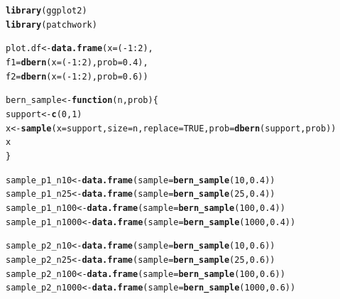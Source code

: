 \documentclass{article}\usepackage[]{graphicx}\usepackage[]{color}
\makeatletter
\newcommand{\hlnum}[1]{\textcolor[rgb]{0.686,0.059,0.569}{#1}}%
\newcommand{\hlopt}[1]{\textcolor[rgb]{0,0,0}{#1}}%
\newcommand{\hlstd}[1]{\textcolor[rgb]{0.345,0.345,0.345}{#1}}%
\newcommand{\hlkwa}[1]{\textcolor[rgb]{0.161,0.373,0.58}{\textbf{#1}}}%
\newcommand{\hlkwb}[1]{\textcolor[rgb]{0.69,0.353,0.396}{#1}}%
\newcommand{\hlkwc}[1]{\textcolor[rgb]{0.333,0.667,0.333}{#1}}%
\newcommand{\hlkwd}[1]{\textcolor[rgb]{0.737,0.353,0.396}{\textbf{#1}}}%
\newenvironment{kframe}{%
 \def\at@end@of@kframe{}%
 \ifinner\ifhmode%
  \def\at@end@of@kframe{\end{minipage}}%
  \begin{minipage}{\columnwidth}%
 \fi\fi%
 \def\FrameCommand##1{\hskip\@totalleftmargin \hskip-\fboxsep
 \colorbox{shadecolor}{##1}\hskip-\fboxsep
     \hskip-\linewidth \hskip-\@totalleftmargin \hskip\columnwidth}%
 \MakeFramed {\advance\hsize-\width
   \@totalleftmargin\z@ \linewidth\hsize
   \@setminipage}}%
 {\par\unskip\endMakeFramed%
 \at@end@of@kframe}
\newenvironment{knitrout}{}{} %
\makeatother
\begin{document}
\begin{enumerate}
\begin{enumerate}
\begin{knitrout}
\begin{kframe}
\begin{alltt}
\hlkwd{library}\hlstd{(ggplot2)}
\hlkwd{library}\hlstd{(patchwork)}

\hlstd{plot.df} \hlkwb{<-} \hlkwd{data.frame}\hlstd{(}\hlkwc{x} \hlstd{= (}\hlopt{-}\hlnum{1}\hlopt{:}\hlnum{2}\hlstd{),}
                      \hlkwc{f1} \hlstd{=} \hlkwd{dbern}\hlstd{(}\hlkwc{x} \hlstd{= (}\hlopt{-}\hlnum{1}\hlopt{:}\hlnum{2}\hlstd{),} \hlkwc{prob} \hlstd{=} \hlnum{0.4}\hlstd{),}
                      \hlkwc{f2} \hlstd{=} \hlkwd{dbern}\hlstd{(}\hlkwc{x} \hlstd{= (}\hlopt{-}\hlnum{1}\hlopt{:}\hlnum{2}\hlstd{),} \hlkwc{prob} \hlstd{=} \hlnum{0.6}\hlstd{))}

\hlstd{bern_sample} \hlkwb{<-} \hlkwa{function}\hlstd{(}\hlkwc{n}\hlstd{,}\hlkwc{prob}\hlstd{)\{}
  \hlstd{support} \hlkwb{<-} \hlkwd{c}\hlstd{(}\hlnum{0}\hlstd{,}\hlnum{1}\hlstd{)}
  \hlstd{x} \hlkwb{<-} \hlkwd{sample}\hlstd{(}\hlkwc{x} \hlstd{= support,} \hlkwc{size}\hlstd{=n,} \hlkwc{replace}\hlstd{=}\hlnum{TRUE}\hlstd{,} \hlkwc{prob}\hlstd{=}\hlkwd{dbern}\hlstd{(support, prob))}
  \hlstd{x}
\hlstd{\}}


\hlstd{sample_p1_n10} \hlkwb{<-} \hlkwd{data.frame}\hlstd{(}\hlkwc{sample} \hlstd{=} \hlkwd{bern_sample}\hlstd{(}\hlnum{10}\hlstd{,} \hlnum{0.4}\hlstd{))}
\hlstd{sample_p1_n25} \hlkwb{<-} \hlkwd{data.frame}\hlstd{(}\hlkwc{sample} \hlstd{=} \hlkwd{bern_sample}\hlstd{(}\hlnum{25}\hlstd{,} \hlnum{0.4}\hlstd{))}
\hlstd{sample_p1_n100} \hlkwb{<-} \hlkwd{data.frame}\hlstd{(}\hlkwc{sample} \hlstd{=} \hlkwd{bern_sample}\hlstd{(}\hlnum{100}\hlstd{,} \hlnum{0.4}\hlstd{))}
\hlstd{sample_p1_n1000}\hlkwb{<-} \hlkwd{data.frame}\hlstd{(}\hlkwc{sample} \hlstd{=} \hlkwd{bern_sample}\hlstd{(}\hlnum{1000}\hlstd{,} \hlnum{0.4}\hlstd{))}

\hlstd{sample_p2_n10} \hlkwb{<-} \hlkwd{data.frame}\hlstd{(}\hlkwc{sample} \hlstd{=} \hlkwd{bern_sample}\hlstd{(}\hlnum{10}\hlstd{,} \hlnum{0.6}\hlstd{))}
\hlstd{sample_p2_n25} \hlkwb{<-} \hlkwd{data.frame}\hlstd{(}\hlkwc{sample} \hlstd{=} \hlkwd{bern_sample}\hlstd{(}\hlnum{25}\hlstd{,} \hlnum{0.6}\hlstd{))}
\hlstd{sample_p2_n100} \hlkwb{<-} \hlkwd{data.frame}\hlstd{(}\hlkwc{sample} \hlstd{=} \hlkwd{bern_sample}\hlstd{(}\hlnum{100}\hlstd{,} \hlnum{0.6}\hlstd{))}
\hlstd{sample_p2_n1000}\hlkwb{<-} \hlkwd{data.frame}\hlstd{(}\hlkwc{sample} \hlstd{=} \hlkwd{bern_sample}\hlstd{(}\hlnum{1000}\hlstd{,} \hlnum{0.6}\hlstd{))}



\end{alltt}
\end{kframe}
\end{knitrout}
\end{enumerate}
\end{enumerate}
\end{document}

